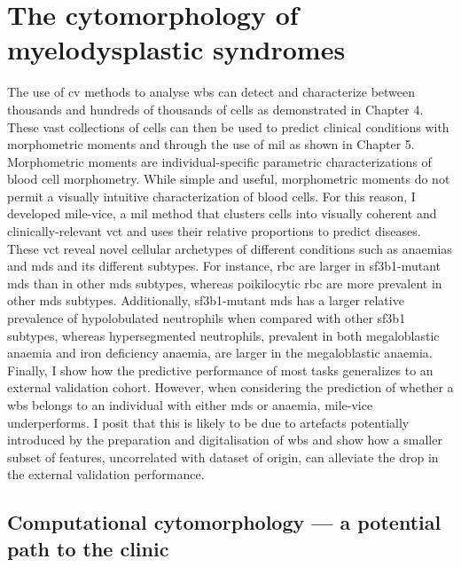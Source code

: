 \section{The cytomorphology of myelodysplastic syndromes} 

The use of \ac{cv} methods to analyse \ac{wbs} can detect and characterize between thousands and hundreds of thousands of cells as demonstrated in Chapter 4. These vast collections of cells can then be used to predict clinical conditions with morphometric moments and through the use of \ac{mil} as shown in Chapter 5. Morphometric moments are individual-specific parametric characterizations of blood cell morphometry. While simple and useful, morphometric moments do not permit a visually intuitive characterization of blood cells. For this reason, I developed \ac{mile-vice}, a \ac{mil} method that clusters cells into visually coherent and clinically-relevant \ac{vct} and uses their relative proportions to predict diseases. These \ac{vct} reveal novel cellular archetypes of different conditions such as anaemias and \ac{mds} and its different subtypes. For instance, \ac{rbc} are larger in \ac{sf3b1}-mutant \ac{mds} than in other \ac{mds} subtypes, whereas poikilocytic \ac{rbc} are more prevalent in other \ac{mds} subtypes. Additionally, \ac{sf3b1}-mutant \ac{mds} has a larger relative prevalence of hypolobulated neutrophils when compared with other \ac{sf3b1} subtypes, whereas hypersegmented neutrophils, prevalent in both megaloblastic anaemia and iron deficiency anaemia, are larger in the megaloblastic anaemia. Finally, I show how the predictive performance of most tasks generalizes to an external validation cohort. However, when considering the prediction of whether a \ac{wbs} belongs to an individual with either \ac{mds} or anaemia, \ac{mile-vice} underperforms. I posit that this is likely to be due to artefacts potentially introduced by the preparation and digitalisation of \ac{wbs} and show how a smaller subset of features, uncorrelated with dataset of origin, can alleviate the drop in the external validation performance.

\subsection{Computational cytomorphology --- a potential path to the clinic} 

